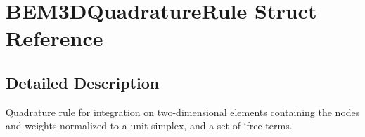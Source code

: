 \section{B\+E\+M3\+D\+Quadrature\+Rule Struct Reference}
\label{structBEM3DQuadratureRule}


\subsection{Detailed Description}
Quadrature rule for integration on two-\/dimensional elements containing the nodes and weights normalized to a unit simplex, and a set of `free terms\textquotesingle{}. 